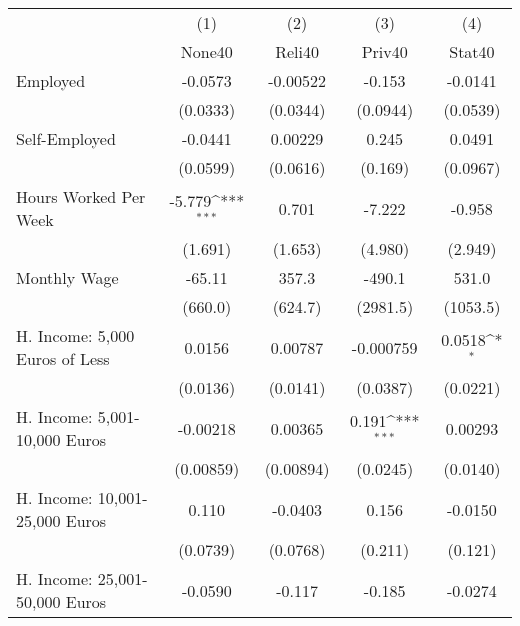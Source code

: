 {
\def\sym#1{\ifmmode^{#1}\else\(^{#1}\)\fi}
\begin{tabular}{l*{4}{c}}
\hline\hline
            &\multicolumn{1}{c}{(1)}&\multicolumn{1}{c}{(2)}&\multicolumn{1}{c}{(3)}&\multicolumn{1}{c}{(4)}\\
            &\multicolumn{1}{c}{None40}&\multicolumn{1}{c}{Reli40}&\multicolumn{1}{c}{Priv40}&\multicolumn{1}{c}{Stat40}\\
\hline
Employed    &     -0.0573         &    -0.00522         &      -0.153         &     -0.0141         \\
            &    (0.0333)         &    (0.0344)         &    (0.0944)         &    (0.0539)         \\
[1em]
Self-Employed&     -0.0441         &     0.00229         &       0.245         &      0.0491         \\
            &    (0.0599)         &    (0.0616)         &     (0.169)         &    (0.0967)         \\
[1em]
Hours Worked Per Week&      -5.779\sym{***}&       0.701         &      -7.222         &      -0.958         \\
            &     (1.691)         &     (1.653)         &     (4.980)         &     (2.949)         \\
[1em]
Monthly Wage&      -65.11         &       357.3         &      -490.1         &       531.0         \\
            &     (660.0)         &     (624.7)         &    (2981.5)         &    (1053.5)         \\
[1em]
H. Income: 5,000 Euros of Less&      0.0156         &     0.00787         &   -0.000759         &      0.0518\sym{*}  \\
            &    (0.0136)         &    (0.0141)         &    (0.0387)         &    (0.0221)         \\
[1em]
H. Income: 5,001-10,000 Euros&    -0.00218         &     0.00365         &       0.191\sym{***}&     0.00293         \\
            &   (0.00859)         &   (0.00894)         &    (0.0245)         &    (0.0140)         \\
[1em]
H. Income: 10,001-25,000 Euros&       0.110         &     -0.0403         &       0.156         &     -0.0150         \\
            &    (0.0739)         &    (0.0768)         &     (0.211)         &     (0.121)         \\
[1em]
H. Income: 25,001-50,000 Euros&     -0.0590         &      -0.117         &      -0.185         &     -0.0274         \\

\end{tabular}}
